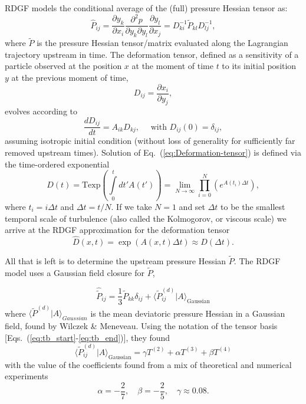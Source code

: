 RDGF models the conditional average of the (full) pressure Hessian tensor as:
\begin{equation}
    \hat{P}_{ij} = \frac{\partial y_k}{\partial x_i} \frac{\partial^2 p}{\partial y_k\partial y_l} \frac{\partial y_l}{\partial x_j} = D^{-1}_{ki} \tilde{P}_{kl} D^{-1}_{lj},
\end{equation}
where $\tilde{P}$ is the pressure Hessian tensor/matrix evaluated along the Lagrangian trajectory upstream in time. The deformation tensor, defined as a sensitivity  of a particle observed at the position $x$ at the moment of time $t$ to its initial position $y$ at the previous moment of time,
\begin{equation}
    D_{ij} = \frac{\partial x_i}{\partial y_j},
\end{equation}
evolves according to 
\begin{equation}\label{eq:Deformation-tensor}
    \frac{d D_{ij}}{dt} = A_{ik} D_{kj}, \quad \text{ with }  D_{ij}(0) = \delta_{ij},
\end{equation}
assuming isotropic initial condition (without loss of generality for sufficiently far removed upstream times). Solution of Eq.~(\ref{eq:Deformation-tensor}) is defined via the time-ordered exponential
\begin{equation} \label{eq:defTensor}
    D(t) = \text{Texp}\left(\int\limits_0^t dt' A(t')\right) = \lim_{N\to \infty} \prod_{i = 0}^N \left( e^{A(t_i)\Delta t} \right),
\end{equation}
where %
$t_i=i \Delta t$ and $\Delta t= t/N$. %
If we take $N=1$ and set $\Delta t$ to be the smallest temporal scale of turbulence (also called the Kolmogorov, or viscous scale) we arrive at %
the RDGF approximation for the deformation tensor
\begin{equation}
    \hat{D}(x,t) = \exp\left( A(x,t) \Delta t \right) \approx D(\Delta t).
\end{equation}

All that is left is to determine the upstream pressure Hessian $\tilde P$. The RDGF model uses a Gaussian field closure for $\tilde P$,

\begin{equation} \label{eq:rdgf_upstream}
    \hat{\tilde{P}}_{ij} = \frac{1}{3} \tilde{P}_{kk} \delta_{ij} + \langle \tilde{P}^{(d)}_{ij} | A 
    \rangle_{\text{Gaussian}}
\end{equation}
where $\langle \tilde{P}^{(d)} | A\rangle_{Gaussian}$ is the mean deviatoric pressure Hessian in a Gaussian field, found by Wilczek \& Meneveau\cite{wilczek2014pressure}. Using the notation of the tensor basis [Eqs.~(\ref{eq:tb_start}-\ref{eq:tb_end})], they found
\begin{equation}
    \langle \tilde{P}^{(d)}_{ij} | A \rangle_{\text{Gaussian}} = \gamma T^{(2)} + \alpha T^{(3)} + \beta T^{(4)}
\end{equation}
with the value of the coefficients found from a mix of theoretical and numerical experiments
\begin{equation} \label{eq:rdgf_coefs}
    \alpha = -\frac{2}{7}, \quad \beta=-\frac{2}{5}, \quad \gamma \approx 0.08.
\end{equation}


